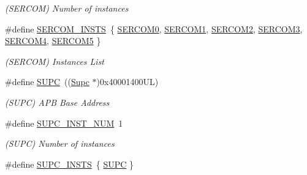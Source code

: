 \begin{DoxyCompactItemize}
\begin{DoxyCompactList}\small\item\em (S\+E\+R\+C\+O\+M) Number of instances \end{DoxyCompactList}\item 
\hypertarget{group___s_a_m_l21_j18_a__base_gadb03dbe1ef2a3400f0a16b58948053a7}{}\#define \hyperlink{group___s_a_m_l21_j18_a__base_gadb03dbe1ef2a3400f0a16b58948053a7}{S\+E\+R\+C\+O\+M\+\_\+\+I\+N\+S\+T\+S}~\{ \hyperlink{group___s_a_m_l21_j18_a__base_gae5473788457bad0e69ad9d7f22ed404f}{S\+E\+R\+C\+O\+M0}, \hyperlink{group___s_a_m_l21_j18_a__base_ga130d7d7bc9ef1da1ba1bd094b42449d7}{S\+E\+R\+C\+O\+M1}, \hyperlink{group___s_a_m_l21_j18_a__base_ga918e4c85993961a115bb23b4bb73a87f}{S\+E\+R\+C\+O\+M2}, \hyperlink{group___s_a_m_l21_j18_a__base_gac9f8240be5a40b46cb09617323ebc7e3}{S\+E\+R\+C\+O\+M3}, \hyperlink{group___s_a_m_l21_j18_a__base_gad48343faa88820b8f552aa1eaf66f00a}{S\+E\+R\+C\+O\+M4}, \hyperlink{group___s_a_m_l21_j18_a__base_ga8785a316e608cb0a218f2a59655d6037}{S\+E\+R\+C\+O\+M5} \}\label{group___s_a_m_l21_j18_a__base_gadb03dbe1ef2a3400f0a16b58948053a7}

\begin{DoxyCompactList}\small\item\em (S\+E\+R\+C\+O\+M) Instances List \end{DoxyCompactList}\item 
\hypertarget{group___s_a_m_l21_j18_a__base_ga7318f2eec4a4b784dc63e9364887faa1}{}\#define \hyperlink{group___s_a_m_l21_j18_a__base_ga7318f2eec4a4b784dc63e9364887faa1}{S\+U\+P\+C}~((\hyperlink{struct_supc}{Supc}     $\ast$)0x40001400\+U\+L)\label{group___s_a_m_l21_j18_a__base_ga7318f2eec4a4b784dc63e9364887faa1}

\begin{DoxyCompactList}\small\item\em (S\+U\+P\+C) A\+P\+B Base Address \end{DoxyCompactList}\item 
\hypertarget{group___s_a_m_l21_j18_a__base_ga9715ea8328768e4ecb431a17cc2ef464}{}\#define \hyperlink{group___s_a_m_l21_j18_a__base_ga9715ea8328768e4ecb431a17cc2ef464}{S\+U\+P\+C\+\_\+\+I\+N\+S\+T\+\_\+\+N\+U\+M}~1\label{group___s_a_m_l21_j18_a__base_ga9715ea8328768e4ecb431a17cc2ef464}

\begin{DoxyCompactList}\small\item\em (S\+U\+P\+C) Number of instances \end{DoxyCompactList}\item 
\hypertarget{group___s_a_m_l21_j18_a__base_ga195e0d4101c701b562e4af9e8c2a522b}{}\#define \hyperlink{group___s_a_m_l21_j18_a__base_ga195e0d4101c701b562e4af9e8c2a522b}{S\+U\+P\+C\+\_\+\+I\+N\+S\+T\+S}~\{ \hyperlink{group___s_a_m_l21_j18_a__base_ga7318f2eec4a4b784dc63e9364887faa1}{S\+U\+P\+C} \}\label{group___s_a_m_l21_j18_a__base_ga195e0d4101c701b562e4af9e8c2a522b}


\end{DoxyCompactItemize}
